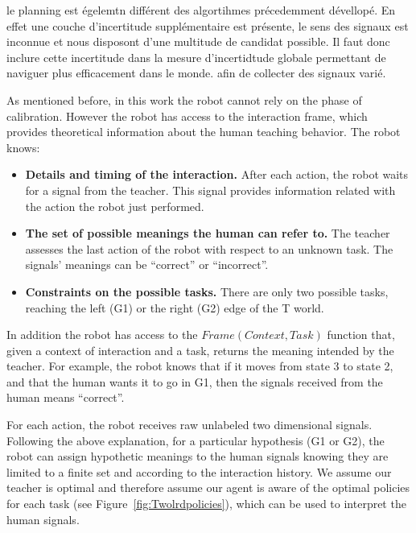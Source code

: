 le planning est égelemtn différent des algortihmes précedemment dévellopé. En effet une couche d'incertitude supplémentaire est présente, le sens des signaux est inconnue et nous disposont d'une multitude de candidat possible. Il faut donc inclure cette incertitude dans la mesure d'incertidtude globale permettant de naviguer plus efficacement dans le monde. afin de collecter des signaux varié. 

As mentioned before, in this work the robot cannot rely on the phase of calibration. However the robot has access to the interaction frame, which provides theoretical information about the human teaching behavior. The robot knows:
\begin{itemize}

\item \textbf{Details and timing of the interaction.} After each action, the robot waits for a signal from the teacher. This signal provides information related with the action the robot just performed.

\item \textbf{The set of possible meanings the human can refer to.} The teacher assesses the last action of the robot with respect to an unknown task. The signals' meanings can be ``correct'' or ``incorrect''.

\item \textbf{Constraints on the possible tasks.} There are only two possible tasks, reaching the left (G1) or the right (G2) edge of the T world.

\end{itemize}

In addition the robot has access to the $Frame(Context,Task)$ function that, given a context of interaction and a task, returns the meaning intended by the teacher. For example, the robot knows that if it moves from state 3 to state 2, and that the human wants it to go in G1, then the signals received from the human means ``correct''.


For each action, the robot receives raw unlabeled two dimensional signals. Following the above explanation, for a particular hypothesis (G1 or G2), the robot can assign hypothetic meanings to the human signals knowing they are limited to a finite set and according to the interaction history. We assume our teacher is optimal and therefore assume our agent is aware of the optimal policies for each task  (see Figure~\ref{fig:Twolrdpolicies}), which can be used to interpret the human signals.


